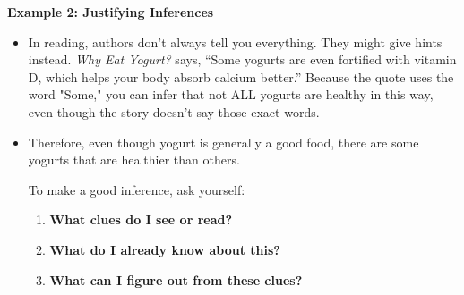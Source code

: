 \documentclass[12pt]{article}
\begin{document}
\begin{tcolorbox}[colframe=black!60, colback=white, 
coltitle=black, colbacktitle=black!15, fonttitle=\bfseries\Large, 
title=Examples, halign title=center, left=10pt, right=10pt, top=10pt, bottom=15pt]

\textbf{Example 2: Justifying Inferences}
\begin{itemize}
    \item In reading, authors don’t always tell you everything. They might give hints instead. \textit{Why Eat Yogurt?} says, “Some yogurts are even fortified with vitamin D, which helps your body absorb calcium better.” Because the quote uses the word "Some," you can infer that not ALL yogurts are healthy in this way, even though the story doesn’t say those exact words.
    \item  Therefore, even though yogurt is generally a good food, there are some yogurts that are healthier than others.

To make a good inference, ask yourself:

\begin{enumerate}
    \item \textbf{What clues do I see or read?}
    \item \textbf{What do I already know about this?}
    \item \textbf{What can I figure out from these clues?}
\end{enumerate}
 
\end{itemize}

     \end{tcolorbox}
\vspace{1em}

 \underline{\hspace{17cm}}
    \\[0.8cm] \underline{\hspace{17cm}}
    \\[0.8cm] \underline{\hspace{17cm}}
    \\[0.8cm] \underline{\hspace{17cm}}
    \\[0.8cm] \underline{\hspace{17cm}}
    \\[0.8cm] \underline{\hspace{17cm}}
    \\[0.8cm] \underline{\hspace{17cm}}
    \\[0.8cm] \underline{\hspace{17cm}}
    \\[0.8cm] \underline{\hspace{17cm}}
    \\[0.8cm] \underline{\hspace{17cm}}
\end{document}
